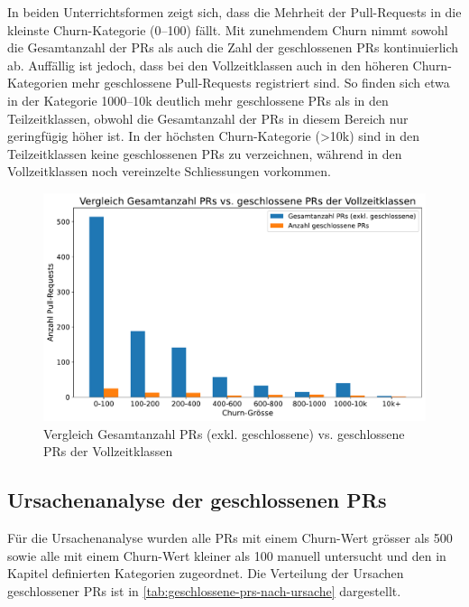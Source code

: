 In beiden Unterrichtsformen zeigt sich, dass die Mehrheit der Pull-Requests in die kleinste Churn-Kategorie (0–100) fällt. Mit zunehmendem Churn nimmt sowohl die Gesamtanzahl der PRs als auch die Zahl der geschlossenen PRs kontinuierlich ab. Auffällig ist jedoch, dass bei den Vollzeitklassen auch in den höheren Churn-Kategorien mehr geschlossene Pull-Requests registriert sind. So finden sich etwa in der Kategorie 1000–10k deutlich mehr geschlossene PRs als in den Teilzeitklassen, obwohl die Gesamtanzahl der PRs in diesem Bereich nur geringfügig höher ist.
In der höchsten Churn-Kategorie (>10k) sind in den Teilzeitklassen keine geschlossenen PRs zu verzeichnen, während in den Vollzeitklassen noch vereinzelte Schliessungen vorkommen. 

\begin{figure}[htbp]
    \includegraphics[width=\textwidth]{Figures/vergleich-gesamtanzahl-prs-vs-closed-vollzeit.pdf}
    \caption{Vergleich Gesamtanzahl PRs (exkl. geschlossene) vs. geschlossene PRs der Vollzeitklassen}
    \label{fig:vergleich-gesamtanzahl-prs-vs-closed-vollzeit}
\end{figure}

\newpage

\subsection{Ursachenanalyse der geschlossenen PRs}
Für die Ursachenanalyse wurden alle PRs mit einem Churn-Wert grösser als 500 sowie alle mit einem Churn-Wert kleiner als 100 manuell untersucht und den in Kapitel  definierten Kategorien zugeordnet. 
Die Verteilung der Ursachen geschlossener PRs ist in \autoref{tab:geschlossene-prs-nach-ursache} dargestellt.


